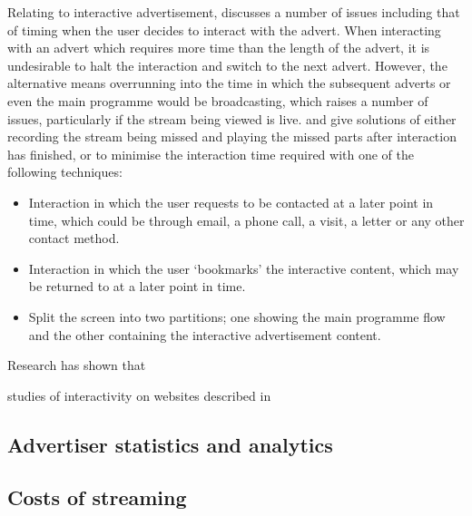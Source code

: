 	Relating to interactive advertisement, \citet{integrated-approach-advertising} discusses a number of issues including that of timing when the user decides to interact with the advert. When interacting with an advert which requires more time than the length of the advert, it is undesirable to halt the interaction and switch to the next advert. However, the alternative means overrunning into the time in which the subsequent adverts or even the main programme would be broadcasting, which raises a number of issues, particularly if the stream being viewed is live. \citet{integrated-approach-advertising} and \citet{personalised_interactive_tv_advertising} give solutions of either recording the stream being missed and playing the missed parts after interaction has finished, or to minimise the interaction time required with one of the following techniques:
	\begin{itemize}
		\item Interaction in which the user requests to be contacted at a later point in time, which could be through email, a phone call, a visit, a letter or any other contact method.
		\item Interaction in which the user `bookmarks' the interactive content, which may be returned to at a later point in time.
		\item Split the screen into two partitions; one showing the main programme flow and the other containing the interactive advertisement content. 
	\end{itemize}


	\citet{informationOverload}

	Research has shown that \citet{humanVariables}
	
	studies of interactivity on websites described in \citet{Teo2003281}

\subsection{Advertiser statistics and analytics}

\subsection{Costs of streaming}

